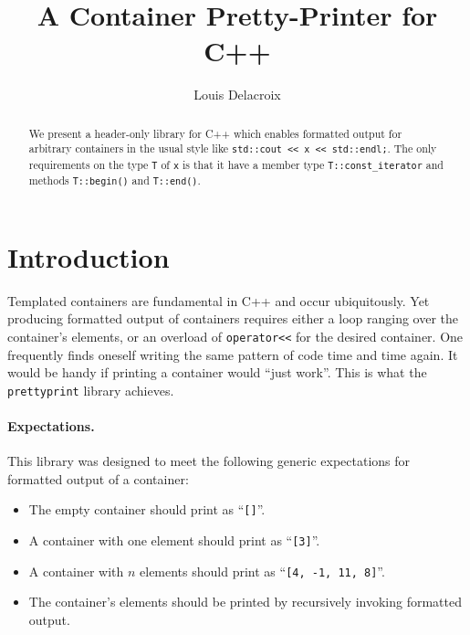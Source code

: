 \documentclass[a4paper,11pt]{article}
\title{A Container Pretty-Printer for C++}
\author{Louis Delacroix}
\date{}
\begin{document}
\maketitle

\begin{abstract}\noindent
We present a header-only library for C++ which enables formatted
output for arbitrary containers in the usual style like \texttt{std::cout
<< x << std::endl;}. The only requirements on the type \texttt{T} of
\texttt{x} is that it have a member type \texttt{T::const\_iterator} and
methods \texttt{T::begin()} and \texttt{T::end()}.
\end{abstract}

\section*{Introduction}

Templated containers are fundamental in C++ and occur ubiquitously. Yet
producing formatted output of containers requires either a loop ranging
over the container's elements, or an overload of \texttt{operator<<} for
the desired container. One frequently finds oneself writing the same
pattern of code time and time again. It would be handy if printing a
container would ``just work''. This is what the \texttt{prettyprint}
library achieves.

\paragraph{Expectations.} This library was designed to meet the following
generic expectations for formatted output of a container:

\begin{itemize}
\item The empty container should print as ``\texttt{[]}''.
\item A container with one element should print as ``\texttt{[3]}''.
\item A container with $n$ elements should print as ``\texttt{[4, -1, 11, 8]}''.
\item The container's elements should be printed by recursively invoking formatted output.
\end{itemize}
\end{document}
